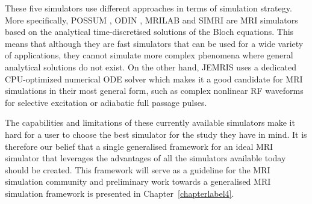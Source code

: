These five simulators use different approaches in terms of simulation strategy.
More specifically, 
POSSUM \cite{Drobnjak2006}, 
ODIN \cite{Jochimsen2006}, 
MRILAB \cite{Liu2017} and
SIMRI \cite{Benoit-Cattin2005} 
are MRI simulators based on the analytical time-discretised solutions of the Bloch equations.
This means that although they are fast simulators that can be used for a wide variety of applications, they cannot simulate more complex phenomena where general analytical solutions do not exist.
On the other hand,
JEMRIS \cite{Stocker2010} uses a dedicated CPU-optimized numerical ODE solver which makes it a good candidate for MRI simulations in their most general form, such as complex nonlinear RF waveforms for selective excitation or adiabatic full passage pulses.

\hfill

The capabilities and limitations of these currently available simulators make it hard for a user to choose the best simulator for the study they have in mind. 
It is therefore our belief that a single generalised framework for an ideal MRI simulator that leverages the advantages of all the simulators available today should be created.
This framework will serve as a guideline for the MRI simulation community and preliminary work towards a generalised MRI simulation framework is presented in Chapter~\ref{chapterlabel4}.







